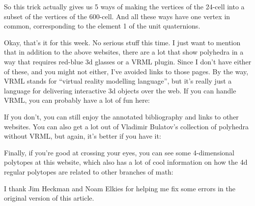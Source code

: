 \documentclass{article}
\def\tightlist{}
\renewcommand{\texttt}[1]{%
  \begingroup
  \ttfamily
  \begingroup\lccode`~=`/\lowercase{\endgroup\def~}{/\discretionary{}{}{}}%
  \begingroup\lccode`~=`[\lowercase{\endgroup\def~}{[\discretionary{}{}{}}%
  \begingroup\lccode`~=`.\lowercase{\endgroup\def~}{.\discretionary{}{}{}}%
  \catcode`/=\active\catcode`[=\active\catcode`.=\active
  \scantokens{#1\noexpand}%
  \endgroup
}
\begin{document}
So this trick actually gives us 5 ways of making the vertices of the
24-cell into a subset of the vertices of the 600-cell. And all these
ways have one vertex in common, corresponding to the element 1 of the
unit quaternions.

Okay, that's it for this week. No serious stuff this time. I just want
to mention that in addition to the above websites, there are a lot that
show polyhedra in a way that requires red-blue 3d glasses or a VRML
plugin. Since I don't have either of these, and you might not either,
I've avoided links to those pages. By the way, VRML stands for ``virtual
reality modelling language'', but it's really just a language for
delivering interactive 3d objects over the web. If you can handle VRML,
you can probably have a lot of fun here:


If you don't, you can still enjoy the annotated bibliography and links
to other websites. You can also get a lot out of Vladimir Bulatov's
collection of polyhedra without VRML, but again, it's better if you have
it:


Finally, if you're good at crossing your eyes, you can see some
4-dimensional polytopes at this website, which also has a lot of cool
information on how the 4d regular polytopes are related to other
branches of math:


I thank Jim Heckman and Noam Elkies for helping me fix some errors in
the original version of this article.
\end{document}
